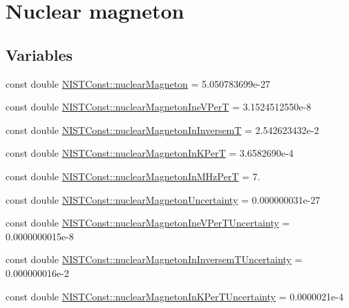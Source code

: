 \hypertarget{group___n_i_s_t_const-_nuclear_magneton}{}\section{Nuclear magneton}
\label{group___n_i_s_t_const-_nuclear_magneton}
\subsection*{Variables}
\begin{DoxyCompactItemize}
\item 
const double \hyperlink{group___n_i_s_t_const-_nuclear_magneton_gacf9b0d2a2517113d30300e4ed7b56cc7}{N\+I\+S\+T\+Const\+::nuclear\+Magneton} = 5.\+050783699e-\/27
\item 
const double \hyperlink{group___n_i_s_t_const-_nuclear_magneton_ga5a31a1865923a1c14cd7f22c8973186e}{N\+I\+S\+T\+Const\+::nuclear\+Magneton\+Ine\+V\+PerT} = 3.\+1524512550e-\/8
\item 
const double \hyperlink{group___n_i_s_t_const-_nuclear_magneton_ga2bb8e56daaa602b5097d38b2d1ca32ad}{N\+I\+S\+T\+Const\+::nuclear\+Magneton\+In\+InversemT} = 2.\+542623432e-\/2
\item 
const double \hyperlink{group___n_i_s_t_const-_nuclear_magneton_gac546d7a48ca06ce3231f7cda738bb4e3}{N\+I\+S\+T\+Const\+::nuclear\+Magneton\+In\+K\+PerT} = 3.\+6582690e-\/4
\item 
const double \hyperlink{group___n_i_s_t_const-_nuclear_magneton_gae1ed12acbc3f50345ed451327b86b5b5}{N\+I\+S\+T\+Const\+::nuclear\+Magneton\+In\+M\+Hz\+PerT} = 7.
\item 
const double \hyperlink{group___n_i_s_t_const-_nuclear_magneton_ga1f693f4e6c1d8f771594a847e185b072}{N\+I\+S\+T\+Const\+::nuclear\+Magneton\+Uncertainty} = 0.\+000000031e-\/27
\item 
const double \hyperlink{group___n_i_s_t_const-_nuclear_magneton_gad4934d98a9f09cb4bae556e2aa11ff84}{N\+I\+S\+T\+Const\+::nuclear\+Magneton\+Ine\+V\+Per\+T\+Uncertainty} = 0.\+0000000015e-\/8
\item 
const double \hyperlink{group___n_i_s_t_const-_nuclear_magneton_ga084f0bd27d89a4475362e8e2e0393bfa}{N\+I\+S\+T\+Const\+::nuclear\+Magneton\+In\+Inversem\+T\+Uncertainty} = 0.\+000000016e-\/2
\item 
const double \hyperlink{group___n_i_s_t_const-_nuclear_magneton_gaf3f8996bdff7edd5515c4a91fe599509}{N\+I\+S\+T\+Const\+::nuclear\+Magneton\+In\+K\+Per\+T\+Uncertainty} = 0.\+0000021e-\/4

\end{DoxyCompactItemize}
